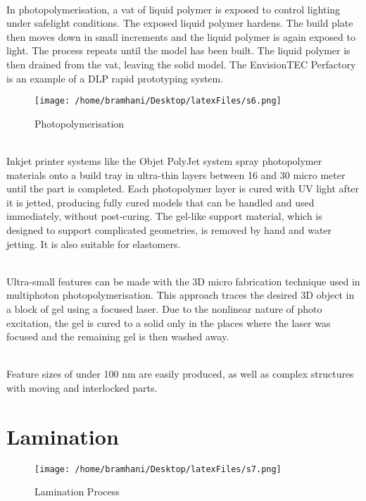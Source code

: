 \documentclass[12pt,a4paper]{report}
\begin{document}
	
	\indent
	\\In photopolymerisation, a vat of liquid polymer is exposed to control lighting under safelight
	conditions. The exposed liquid polymer hardens. The build plate then moves down in small
	increments and the liquid polymer is again exposed to light. The process repeats until the model has
	been built. The liquid polymer is then drained from the vat, leaving the solid model. The
	EnvisionTEC Perfactory is an example of a DLP rapid prototyping system.\par
	
	\begin{figure}[H]
		\centering
		\texttt{[image: /home/bramhani/Desktop/latexFiles/s6.png]}
		\label{fig:Photopolymerisation}
		\caption{Photopolymerisation}
	\end{figure}
	
	\indent
	\\Inkjet printer systems like the Objet PolyJet system spray photopolymer materials onto a
	build tray in ultra-thin layers between 16 and 30 micro meter until the part is completed. Each
	photopolymer layer is cured with UV light after it is jetted, producing fully cured models that can
	be handled and used immediately, without post-curing. The gel-like support material, which is
	designed to support complicated geometries, is removed by hand and water jetting. It is also
	suitable for elastomers.\par
	
	\indent
	\\Ultra-small features can be made with the 3D micro fabrication technique used in multiphoton
	photopolymerisation. This approach traces the desired 3D object in a block of gel using a focused
	laser. Due to the nonlinear nature of photo excitation, the gel is cured to a solid only in the places
	where the laser was focused and the remaining gel is then washed away.\par
	
	
	\indent
	\\Feature sizes of under 100 nm are easily produced, as well as complex structures with moving
	and interlocked parts.\par
	
	\section{Lamination}
	
	\begin{figure}[H]
		\centering
		\texttt{[image: /home/bramhani/Desktop/latexFiles/s7.png]}
		\label{fig:Lamination Process}
		\caption{Lamination Process}
	\end{figure}
	
\end{document}
